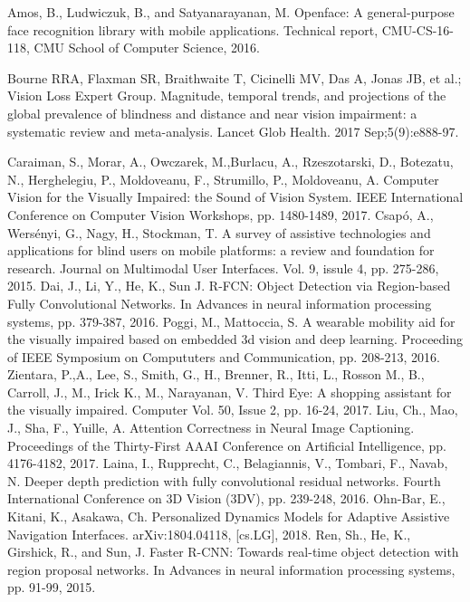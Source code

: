 \documentclass[10pt,conference,compsocconf]{IEEEtran}
\begin{document}
\begin{thebibliography}{1}
 Amos, B., Ludwiczuk, B., and Satyanarayanan, M. Openface:
A general-purpose face recognition library with mobile applications. Technical report, CMU-CS-16-118, CMU School of Computer Science, 2016.

 Bourne RRA, Flaxman SR, Braithwaite T, Cicinelli MV, Das A, Jonas JB, et al.; Vision Loss Expert Group. Magnitude, temporal trends, and projections of the global prevalence of blindness and distance and near vision impairment: a systematic review and meta-analysis. Lancet Glob Health.  2017 Sep;5(9):e888-97.

 Caraiman, S., Morar, A., Owczarek, M.,Burlacu, A., Rzeszotarski, D., Botezatu, N., Herghelegiu, P., Moldoveanu, F., Strumillo, P., Moldoveanu, A. Computer Vision for the Visually Impaired: the Sound of Vision System. IEEE International Conference on Computer Vision Workshops, pp. 1480-1489, 2017.
 Csap\'{o}, A., Wers\'{e}nyi, G., Nagy, H., Stockman, T. A survey of assistive technologies and applications for blind users on mobile platforms: a review and foundation for research. Journal on Multimodal User Interfaces. Vol. 9, issule 4,  pp. 275-286, 2015.
 Dai, J., Li, Y., He, K., Sun J. R-FCN: Object Detection via Region-based Fully Convolutional Networks. In Advances in neural information processing systems, pp. 379-387, 2016.
 Poggi, M., Mattoccia, S. A wearable mobility aid for the visually impaired based on embedded 3d vision and deep learning. Proceeding of IEEE Symposium on Compututers and Communication, pp. 208-213, 2016.
 Zientara, P.,A., Lee, S., Smith, G., H., Brenner, R., Itti, L., Rosson M., B., Carroll, J., M., Irick K., M., Narayanan, V. Third Eye: A shopping assistant for the visually impaired. Computer Vol. 50, Issue 2, pp. 16-24, 2017.
 Liu, Ch., Mao, J., Sha, F., Yuille, A. Attention Correctness in Neural Image Captioning. Proceedings of the Thirty-First AAAI Conference on Artificial Intelligence, pp. 4176-4182, 2017.
 Laina, I., Rupprecht, C., Belagiannis, V., Tombari, F., Navab, N. Deeper depth prediction with fully convolutional residual networks. Fourth International Conference on 3D Vision (3DV), pp. 239-248, 2016.
  Ohn-Bar, E., Kitani, K., Asakawa, Ch. Personalized Dynamics Models for Adaptive Assistive Navigation Interfaces. arXiv:1804.04118, [cs.LG], 2018.
 Ren, Sh., He, K., Girshick, R., and Sun, J.  Faster R-CNN: Towards real-time object detection with region proposal networks. In Advances in neural information processing systems, pp. 91-99, 2015.


\end{thebibliography}
\end{document}
